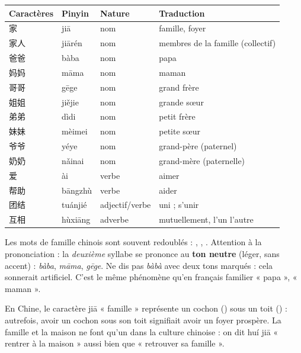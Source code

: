 \documentclass[11pt]{article}
\newcommand{\cle}[1]{{\popxbold\color{popdark}#1}}
\newcommand{\zh}[1]{\ifmmode\text{#1}\else{#1}\fi}
\begin{document}
\begin{center}
\begin{tabularx}{\linewidth}{|X|X|X|X|}
\hline
\rowcolor{popblueL} Caractères & Pinyin & Nature & Traduction \\
\hline
家 & jiā & nom & famille, foyer \\
\hline
家人 & jiārén & nom & membres de la famille (collectif) \\
\hline
爸爸 & bàba & nom & papa \\
\hline
妈妈 & māma & nom & maman \\
\hline
哥哥 & gēge & nom & grand frère \\
\hline
姐姐 & jiějie & nom & grande sœur \\
\hline
弟弟 & dìdi & nom & petit frère \\
\hline
妹妹 & mèimei & nom & petite sœur \\
\hline
爷爷 & yéye & nom & grand-père (paternel) \\
\hline
奶奶 & nǎinai & nom & grand-mère (paternelle) \\
\hline
爱 & ài & verbe & aimer \\
\hline
帮助 & bāngzhù & verbe & aider \\
\hline
团结 & tuánjié & adjectif/verbe & uni ; s'unir \\
\hline
互相 & hùxiāng & adverbe & mutuellement, l'un l'autre \\
\hline
\end{tabularx}
\end{center}

\begin{attention}
Les mots de famille chinois sont souvent \cle{redoublés} : \zh{爸爸}, \zh{妈妈}, \zh{哥哥}. Attention à la prononciation : la \emph{deuxième} syllabe se prononce au \textbf{ton neutre} (léger, sans accent) : \emph{bàba}, \emph{māma}, \emph{gēge}. Ne dis pas \emph{bàbà} avec deux tons marqués : cela sonnerait artificiel. C'est le même phénomène qu'en français familier « papa », « maman ».
\end{attention}

\begin{savaistu}
En Chine, le caractère \zh{家} jiā « famille » représente un cochon (\zh{豕}) sous un toit (\zh{宀}) : autrefois, avoir un cochon sous son toit signifiait avoir un foyer prospère. La famille et la maison ne font qu'un dans la culture chinoise : on dit \zh{回家} huí jiā « rentrer à la maison » aussi bien que « retrouver sa famille ».
\end{savaistu}
\end{document}
